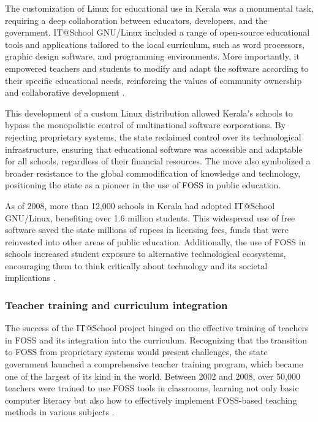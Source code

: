 \begin{refsection}
The customization of Linux for educational use in Kerala was a monumental task, requiring a deep collaboration between educators, developers, and the government. IT@School GNU/Linux included a range of open-source educational tools and applications tailored to the local curriculum, such as word processors, graphic design software, and programming environments. More importantly, it empowered teachers and students to modify and adapt the software according to their specific educational needs, reinforcing the values of community ownership and collaborative development \cite[pp.~10-12]{prabhakar2010itschool}. 

This development of a custom Linux distribution allowed Kerala’s schools to bypass the monopolistic control of multinational software corporations. By rejecting proprietary systems, the state reclaimed control over its technological infrastructure, ensuring that educational software was accessible and adaptable for all schools, regardless of their financial resources. The move also symbolized a broader resistance to the global commodification of knowledge and technology, positioning the state as a pioneer in the use of FOSS in public education.

As of 2008, more than 12,000 schools in Kerala had adopted IT@School GNU/Linux, benefiting over 1.6 million students. This widespread use of free software saved the state millions of rupees in licensing fees, funds that were reinvested into other areas of public education. Additionally, the use of FOSS in schools increased student exposure to alternative technological ecosystems, encouraging them to think critically about technology and its societal implications \cite[pp.~13-15]{prabhakar2010itschool}.

\subsubsection{Teacher training and curriculum integration}

The success of the IT@School project hinged on the effective training of teachers in FOSS and its integration into the curriculum. Recognizing that the transition to FOSS from proprietary systems would present challenges, the state government launched a comprehensive teacher training program, which became one of the largest of its kind in the world. Between 2002 and 2008, over 50,000 teachers were trained to use FOSS tools in classrooms, learning not only basic computer literacy but also how to effectively implement FOSS-based teaching methods in various subjects \cite[pp.~8-9]{prabhakar2010itschool}.


\end{refsection}
